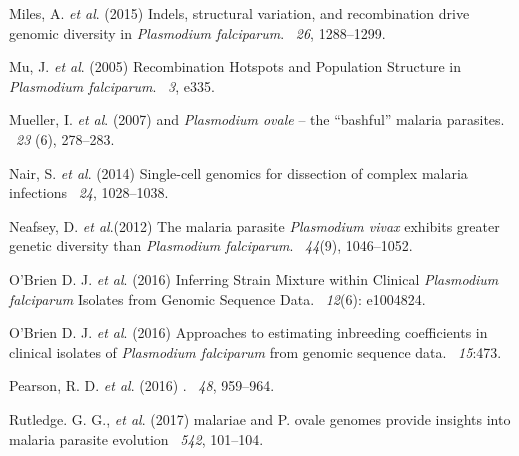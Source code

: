 \documentclass{article}
\begin{document}
\begin{thebibliography}{}
Miles, A. {\em et al}. (2015)
\newblock Indels, structural variation, and recombination drive genomic diversity in {\it Plasmodium falciparum}.
~{\em26\/}, 1288--1299.

Mu, J. {\em et al}. (2005)
\newblock Recombination Hotspots and Population Structure in {\it Plasmodium falciparum}.
~{\em 3}, e335.

Mueller, I. {\em et al}. (2007)
 and {\it Plasmodium ovale} -- the ``bashful'' malaria parasites.
~{\em 23\/} (6), 278--283.

Nair, S. {\em et al}. (2014)
\newblock Single-cell genomics for dissection of complex malaria infections
~{\em 24}, 1028--1038.

Neafsey, D. {\em et al}.(2012)
\newblock The malaria parasite {\it Plasmodium vivax} exhibits greater genetic diversity than {\it Plasmodium falciparum}.
~{\em 44\/}(9), 1046--1052.

O'Brien D. J. {\em et al}. (2016)
\newblock Inferring Strain Mixture within Clinical {\em Plasmodium falciparum} Isolates from Genomic Sequence Data.
~{\em 12\/}(6): e1004824.

O'Brien D. J. {\em et al}. (2016)
\newblock Approaches to estimating inbreeding coefficients in clinical isolates of {\it Plasmodium falciparum} from genomic sequence data.
~{\em 15}:473.

Pearson, R. D. {\em et al}. (2016)
.
~{\em 48}, 959--964.

Rutledge. G. G., {\em et al}. (2017)
 malariae and P. ovale genomes provide insights into malaria parasite evolution
~{\em 542}, 101--104.


\end{thebibliography}
\end{document}
